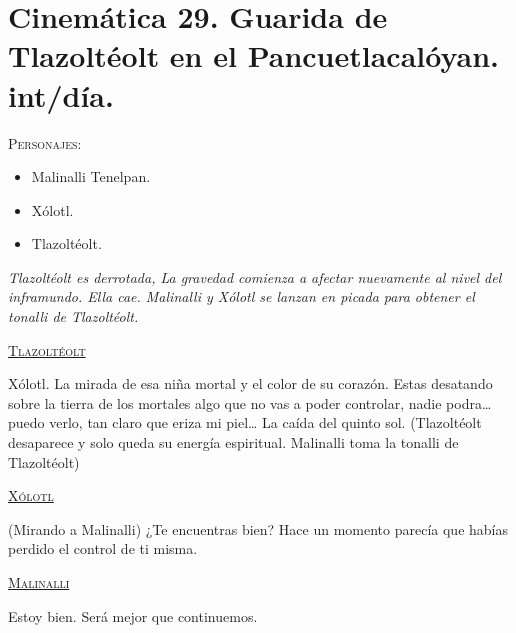 \documentclass[11pt,letterpaper]{article}
\begin{document}
\section{Cinemática 29. Guarida de Tlazoltéolt en el Pancuetlacalóyan. int/día.}
 \textsc{Personajes}:
 \begin{itemize}
 \item Malinalli Tenelpan.
\item Xólotl.
\item Tlazoltéolt.
 \end{itemize}
\textit{Tlazoltéolt es derrotada, La gravedad comienza a afectar nuevamente al nivel del inframundo. Ella cae. Malinalli y Xólotl se lanzan en picada para obtener el tonalli de Tlazoltéolt.}
\begin{center}
\textsc{\underline{Tlazoltéolt}}
\\
\par
Xólotl. La mirada de esa niña mortal y el color de su corazón. Estas desatando sobre la tierra de los mortales algo que no vas a poder controlar, nadie podra… puedo verlo, tan claro que eriza mi piel… La caída del quinto sol. (Tlazoltéolt desaparece y solo queda su energía espiritual. Malinalli toma la tonalli de Tlazoltéolt) 
\\
\par
\textsc{\underline{Xólotl}}
\\
\par
(Mirando a Malinalli) ¿Te encuentras bien? Hace un momento parecía que habías perdido el control de ti misma.
\\
\par
\textsc{\underline{Malinalli}}
\\
\par
Estoy bien. Será mejor que continuemos.
\end{center}
\end{document}
